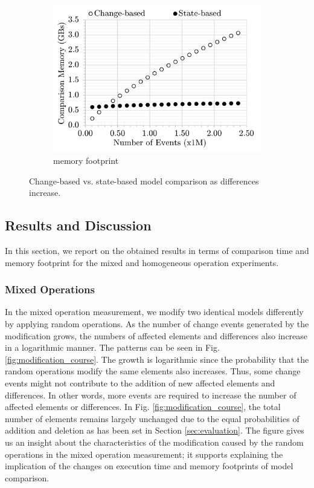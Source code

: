 \documentclass{jot}
\begin{document}
\begin{figure}
\begin{subfigure}[t]{\linewidth}
            \includegraphics[width=\linewidth]{mixed-memory-events}
            \caption{memory footprint}
            \label{fig:memory_diffs}
        \end{subfigure}
        \caption{Change-based vs. state-based model comparison as differences increase.}
        \label{fig:change_vs_state}
    \end{figure}
    
    \vspace{-5pt}
    \subsection{Results and Discussion}
    \label{sec:discussion}
    In this section, we report on the obtained results in terms of comparison time and memory footprint for the mixed and homogeneous operation experiments. 
    
    \vspace{-5pt}
    \subsubsection{Mixed Operations}
    \label{sec:mixed-operation}
    
    In the mixed operation measurement, we modify two identical models differently by applying random operations. As the number of change events generated by the modification grows, the numbers of affected elements and differences also increase in a logarithmic manner. The patterns can be seen in Fig. \ref{fig:modification_course}. The growth is logarithmic since the probability that the random operations modify the same elements also increases. Thus, some change events might not contribute to the addition of new affected elements and differences. In other words, more events are required to increase the number of affected elements or differences. In Fig. \ref{fig:modification_course}, the total number of elements remains largely unchanged due to the equal probabilities of addition and deletion as has been set in Section \ref{sec:evaluation}. The figure gives us an insight about the characteristics of the modification caused by the random operations in the mixed operation measurement; it supports explaining the implication of the changes on execution time and memory footprints of model comparison.
    
\end{document}
